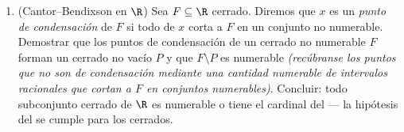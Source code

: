 \begin{problem}
\begin{enumerate}[resume]
   numerable tiene un punto
  aislado, y exhibir uno en el que los puntos aislados sean
   sin serlo todo:
  $K = \{0\} \cup
        \{\frac1n : n \geq 1\}$. \item (Cantor--Bendixson en $\R$) Sea
  $F \subseteq \R$ cerrado. Diremos que $x$ es un \emph{punto de
  condensación} de $F$ si todo
   de $x$ corta a $F$ en un
  conjunto no numerable. Demostrar que los puntos de condensación de un
  cerrado no numerable $F$ forman un cerrado
   no vacío $P$ y que $F
        \setminus P$ es numerable \emph{(recúbranse los puntos que no
  son de condensación mediante una cantidad numerable de intervalos
  racionales que cortan a $F$ en conjuntos numerables)}. Concluir: todo
  subconjunto cerrado de $\R$ es numerable o tiene el cardinal del
   --- la hipótesis del  se cumple para los cerrados.
\end{enumerate}


\end{problem}

